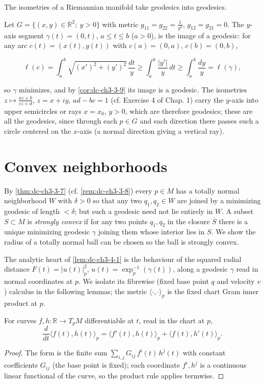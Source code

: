 \begin{example}
  \label{ex:dc-ch3-3-10}
  The isometries of a Riemannian manifold take geodesics into geodesics.
  
  Let $G=\{(x,y)\in\mathbb{R}^2;\ y>0\}$ with metric $g_{11}=g_{22}=\frac{1}{y^2}$,
  $g_{12}=g_{21}=0$. The $y$-axis segment $\gamma(t)=(0,t)$, $a\le t\le b$ ($a>0$),
  is the image of a geodesic: for any arc $c(t)=(x(t),y(t))$ with $c(a)=(0,a)$,
  $c(b)=(0,b)$,
  
  $$
  \ell(c)=\int_a^b\sqrt{(x')^2+(y')^2}\,\frac{dt}{y}\ge\int_a^b\frac{|y'|}{y}\,dt\ge\int_a^b\frac{dy}{y}=\ell(\gamma),
  $$
  
  so $\gamma$ minimizes, and by \cref{cor:dc-ch3-3-9} its image is a geodesic. The
  isometries $z\mapsto\frac{az+b}{cz+d}$, $z=x+iy$, $ad-bc=1$ (cf. Exercise 4 of
  Chap. 1) carry the $y$-axis into upper semicircles or rays $x=x_0$, $y>0$, which
  are therefore geodesics; these are all the geodesics, since through each $p\in G$
  and each direction there passes such a circle centered on the $x$-axis (a normal
  direction giving a vertical ray).
\end{example}

\section{Convex neighborhoods}

By \cref{thm:dc-ch3-3-7} (cf. \cref{rem:dc-ch3-3-8}) every $p\in M$ has a totally normal neighborhood
$W$ with $\delta>0$ so that any two $q_1,q_2\in W$ are joined by a minimizing
geodesic of length $<\delta$; but such a geodesic need not lie entirely in $W$. A
subset $S\subset M$ is \emph{strongly convex} if for any two points $q_1,q_2$ in the
closure $\overline{S}$ there is a unique minimizing geodesic $\gamma$ joining them
whose interior lies in $S$. We show the radius of a totally normal ball can be
chosen so the ball is strongly convex.

The analytic heart of \cref{lem:dc-ch3-4-1} is the behaviour of the squared radial
distance $F(t)=|u(t)|_p^2$, $u(t)=\exp_p^{-1}(\gamma(t))$, along a geodesic $\gamma$
read in normal coordinates at $p$. We isolate its fibrewise (fixed base point $q$
and velocity $v$) calculus in the following lemmas; the metric
$\langle\cdot,\cdot\rangle_p$ is the fixed chart Gram inner product at $p$.

\begin{lemma}
  \label{lem:dc-ch3-4-1-leibniz}
  \leanok
  For curves $f,h:\mathbb{R}\to T_pM$ differentiable at $t$, read in the chart at
  $p$,
  $$\frac{d}{dt}\langle f(t),h(t)\rangle_p
    = \langle f'(t),h(t)\rangle_p + \langle f(t),h'(t)\rangle_p.$$
\end{lemma}
\begin{proof}
  \leanok
  The form is the finite sum $\sum_{i,j}G_{ij}\,f^i(t)\,h^j(t)$ with constant
  coefficients $G_{ij}$ (the base point is fixed); each coordinate $f^i,h^j$ is a
  continuous linear functional of the curve, so the product rule applies termwise.
\end{proof}

